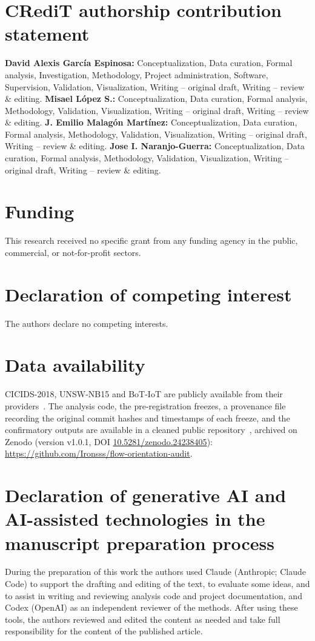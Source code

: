 \documentclass[preprint,12pt]{elsarticle}
\begin{document}
\section*{CRediT authorship contribution statement}
\textbf{David Alexis Garc\'ia Espinosa:} Conceptualization, Data curation, Formal analysis, Investigation, Methodology, Project administration, Software, Supervision, Validation, Visualization, Writing -- original draft, Writing -- review \& editing. \textbf{Misael L\'opez S.:} Conceptualization, Data curation, Formal analysis, Methodology, Validation, Visualization, Writing -- original draft, Writing -- review \& editing. \textbf{J. Emilio Malag\'on Mart\'inez:} Conceptualization, Data curation, Formal analysis, Methodology, Validation, Visualization, Writing -- original draft, Writing -- review \& editing. \textbf{Jose I. Naranjo-Guerra:} Conceptualization, Data curation, Formal analysis, Methodology, Validation, Visualization, Writing -- original draft, Writing -- review \& editing.

\section*{Funding}
This research received no specific grant from any funding agency in the public, commercial, or not-for-profit sectors.

\section*{Declaration of competing interest}
The authors declare no competing interests.

\section*{Data availability}
CICIDS-2018, UNSW-NB15 and BoT-IoT are publicly available from their providers~\cite{sharafaldin2018cicids,moustafa2015unsw,koroniotis2019botiot}. The analysis code, the pre-registration freezes, a provenance file recording the original commit hashes and timestamps of each freeze, and the confirmatory outputs are available in a cleaned public repository~\cite{garcia2026floworientationaudit}, archived on Zenodo (version v1.0.1, DOI \href{https://doi.org/10.5281/zenodo.24238405}{10.5281/zenodo.24238405}): \url{https://github.com/Ironsss/flow-orientation-audit}.

\section*{Declaration of generative AI and AI-assisted technologies in the manuscript preparation process}
During the preparation of this work the authors used Claude (Anthropic; Claude Code) to support the drafting and editing of the text, to evaluate some ideas, and to assist in writing and reviewing analysis code and project documentation, and Codex (OpenAI) as an independent reviewer of the methods. After using these tools, the authors reviewed and edited the content as needed and take full responsibility for the content of the published article.
\end{document}
